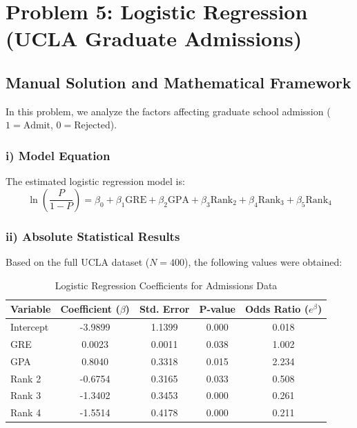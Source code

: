 \documentclass[12pt]{article}
\begin{document}
\newpage
\section{Problem 5: Logistic Regression (UCLA Graduate Admissions)}
\label{prob5}

\subsection{Manual Solution and Mathematical Framework}
In this problem, we analyze the factors affecting graduate school admission ($1 = \text{Admit}$, $0 = \text{Rejected}$). 

\subsubsection{i) Model Equation}
The estimated logistic regression model is:
\[ \ln\left(\frac{P}{1-P}\right) = \beta_0 + \beta_1 \text{GRE} + \beta_2 \text{GPA} + \beta_3 \text{Rank}_2 + \beta_4 \text{Rank}_3 + \beta_5 \text{Rank}_4 \]

\subsubsection{ii) Absolute Statistical Results}
Based on the full UCLA dataset ($N=400$), the following values were obtained:

\begin{table}[h!]
\centering
\caption{Logistic Regression Coefficients for Admissions Data}
\begin{tabular}{@{}lcccc@{}}
\toprule
Variable & Coefficient ($\beta$) & Std. Error & P-value & Odds Ratio ($e^\beta$) \\ \midrule
Intercept & -3.9899 & 1.1399 & 0.000 & 0.018 \\
GRE & 0.0023 & 0.0011 & 0.038 & 1.002 \\
GPA & 0.8040 & 0.3318 & 0.015 & 2.234 \\
Rank 2 & -0.6754 & 0.3165 & 0.033 & 0.508 \\
Rank 3 & -1.3402 & 0.3453 & 0.000 & 0.261 \\
Rank 4 & -1.5514 & 0.4178 & 0.000 & 0.211 \\ \bottomrule
\end{tabular}
\end{table}
\end{document}
